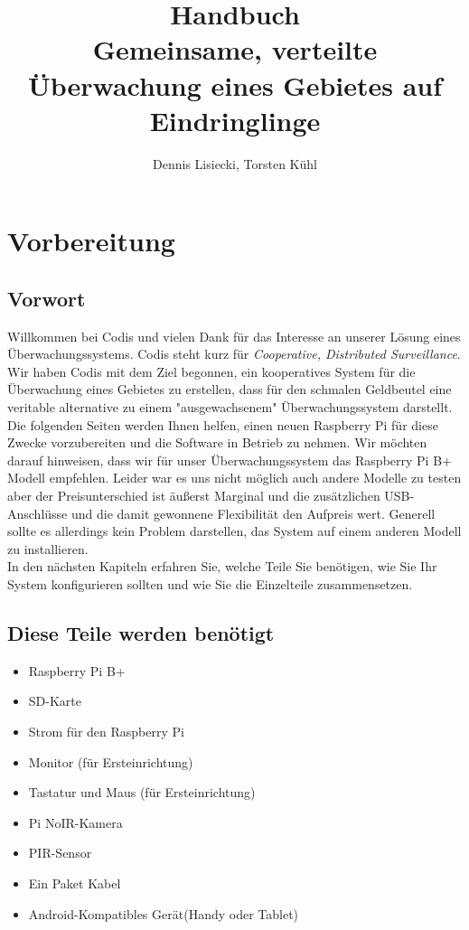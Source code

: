 \documentclass[12pt,a4paper]{scrreprt}
\title{Handbuch \\ Gemeinsame, verteilte Überwachung eines Gebietes auf Eindringlinge}
\author{Dennis Lisiecki, Torsten Kühl}
\begin{document}
\maketitle	%
\tableofcontents	%


\chapter{Vorbereitung}
\section{Vorwort}
Willkommen bei Codis und vielen Dank für das Interesse an unserer Lösung eines Überwachungssystems. Codis steht kurz für \textit{Cooperative, Distributed Surveillance}. Wir haben Codis mit dem Ziel begonnen, ein kooperatives System für die Überwachung eines Gebietes zu erstellen, dass für den schmalen Geldbeutel eine veritable alternative zu einem "ausgewachsenem" Überwachungssystem darstellt. Die folgenden Seiten werden Ihnen helfen, einen neuen Raspberry Pi für diese Zwecke vorzubereiten und die Software in Betrieb zu nehmen. Wir möchten darauf hinweisen, dass wir für unser Überwachungssystem das Raspberry Pi B+ Modell empfehlen. Leider war es uns nicht möglich auch andere Modelle zu testen aber der Preisunterschied ist äußerst Marginal und die zusätzlichen USB-Anschlüsse und die damit gewonnene Flexibilität den Aufpreis wert. Generell sollte es allerdings kein Problem darstellen, das System auf einem anderen Modell zu installieren. \\In den nächsten Kapiteln erfahren Sie, welche Teile Sie benötigen, wie Sie Ihr System konfigurieren sollten und wie Sie die Einzelteile zusammensetzen. 

\section{Diese Teile werden benötigt}
\begin{itemize}
\item Raspberry Pi B+
\item SD-Karte
\item Strom für den Raspberry Pi
\item Monitor (für Ersteinrichtung)
\item Tastatur und Maus (für Ersteinrichtung) 
\item Pi NoIR-Kamera
\item PIR-Sensor
\item Ein Paket Kabel
\item Android-Kompatibles Gerät(Handy oder Tablet)
\end{itemize}
\end{document}
